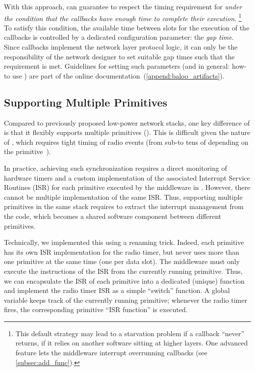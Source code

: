 With this approach, \baloo can guarantee to respect the timing requirement for \ST \textit{under the condition that the callbacks have enough time to complete their execution}.%
\footnote{This default strategy may lead to a starvation problem if a callback ``never'' returns, \eg if it relies on another software sitting at higher layers. One advanced feature lets the middleware interrupt overrunning callbacks (see \cref{subsec:add_func}).}
To satisfy this condition, the available time between slots for the execution of the callbacks is controlled by a dedicated configuration parameter: the \textsl{gap time}.
Since callbacks implement the network layer protocol logic, it can only be the responsibility of the network designer to set suitable gap times such that the  requirement is met.
Guidelines for setting such parameters (and in general: how-to use \baloo) are part of the online documentation~(\cref{append:baloo_artifacts}).
\subsection{Supporting Multiple \ST Primitives}
\label{subsec:multi-ST-primitives}

Compared to previously proposed low-power network stacks, one key difference of \baloo is that it flexibly supports multiple \ST primitives ().
This is difficult given the nature of \ST, which requires tight timing of radio events (from sub-\us to tens of \us depending on the primitive~\cite{yuan2013LetTalkTogether}).

In practice, achieving such synchronization requires a direct monitoring of hardware timers and a custom implementation of the associated Interrupt Service Routines (ISR) for each \ST primitive executed by the middleware in \baloo.
However, there cannot be multiple implementation of the same ISR. Thus, supporting multiple \ST primitives in the same stack requires to extract the interrupt management from the \ST code, which becomes a shared software component between different primitives.

Technically, we implemented this using a renaming trick. Indeed, each \ST primitive has its own ISR implementation for the radio timer, but \baloo never uses more than one \ST primitive at the same time (\ie one per data slot). The middleware must only execute the instructions of the ISR from the currently running primitive.
Thus, we can encapsulate the ISR of each primitive into a dedicated (\ie unique)  function and implement the radio timer ISR as a simple ``switch'' function. A global variable keeps track of the currently running primitive; whenever the radio timer fires, the corresponding primitive ``ISR function'' is executed.

